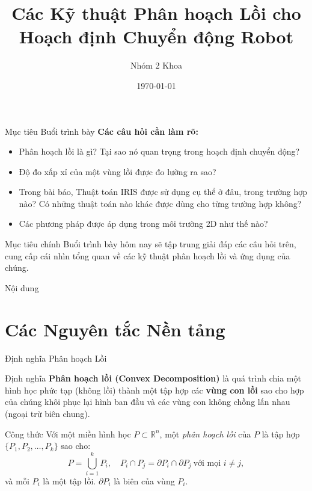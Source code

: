 \documentclass[aspectratio=169]{beamer}
\title{Các Kỹ thuật Phân hoạch Lồi cho Hoạch định Chuyển động Robot}
\author{Nhóm 2 Khoa}
\date{\today}
\begin{document}
\frame{\titlepage}

\begin{frame}{Mục tiêu Buổi trình bày}
    \textbf{Các câu hỏi cần làm rõ:}
    \begin{itemize}
        \item Phân hoạch lồi là gì? Tại sao nó quan trọng trong hoạch định chuyển động?
        \item Độ đo xấp xỉ của một vùng lồi được đo lường ra sao?
        \item Trong bài báo, Thuật toán IRIS được sử dụng cụ thể ở đâu, trong trường hợp nào? Có những thuật
              toán nào khác được dùng cho từng trường hợp không?
        \item Các phương pháp được áp dụng trong môi trường 2D như thế nào?
    \end{itemize}
    
    \vspace{1em}
    \begin{alertblock}{Mục tiêu chính}
        Buổi trình bày hôm nay sẽ tập trung giải đáp các câu hỏi trên, cung cấp cái nhìn tổng quan về các kỹ thuật phân hoạch lồi và ứng dụng của chúng.
    \end{alertblock}
\end{frame}

\begin{frame}{Nội dung}
    \tableofcontents
\end{frame}

\section{Các Nguyên tắc Nền tảng}

\begin{frame}{Định nghĩa Phân hoạch Lồi}

    \begin{block}{Định nghĩa}
        \textbf{Phân hoạch lồi (Convex Decomposition)} là quá trình chia một hình học phức tạp (không lồi) thành một tập hợp các \textbf{vùng con lồi} sao cho hợp của chúng khôi phục lại hình ban đầu và các vùng con không chồng lấn nhau (ngoại trừ biên chung).
    \end{block}

    \begin{block}{Công thức}
        Với một miền hình học $P\subset\mathbb{R}^n$, một \textit{phân hoạch lồi} của $P$ là tập hợp $\{P_1, P_2, \dots, P_k\}$ sao cho:
        \[
            P = \bigcup_{i=1}^{k} P_i, \quad
            P_i \cap P_j = \partial P_i \cap \partial P_j \ \text{với mọi } i \ne j,
        \]
        và mỗi $P_i$ là một tập lồi.
        $\partial P_i$ là biên của vùng $P_i$.
    \end{block}

\end{frame}
\end{document}
